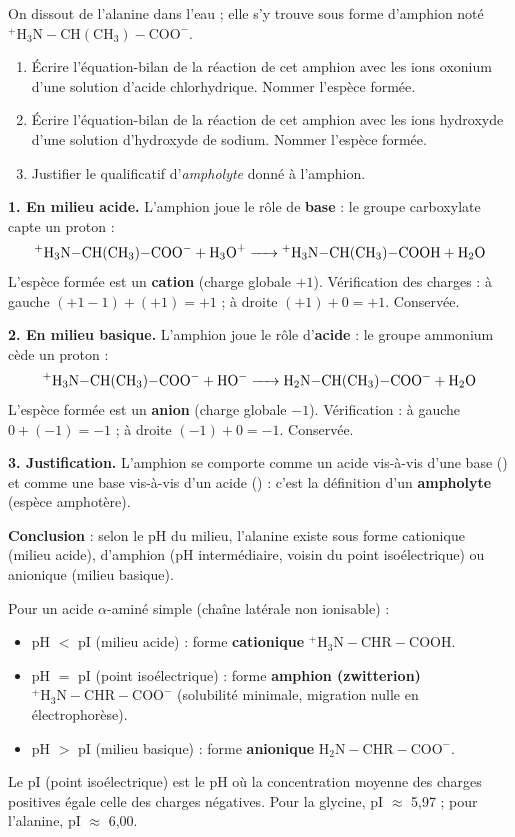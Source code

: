 \documentclass[11pt]{article}
\begin{document}
\begin{exoresolu}
On dissout de l'alanine dans l'eau ; elle s'y trouve sous forme d'amphion noté $\mathrm{^+H_3N{-}CH(CH_3){-}COO^-}$.
\begin{enumerate}
\item Écrire l'équation-bilan de la réaction de cet amphion avec les ions oxonium  d'une solution d'acide chlorhydrique. Nommer l'espèce formée.
\item Écrire l'équation-bilan de la réaction de cet amphion avec les ions hydroxyde  d'une solution d'hydroxyde de sodium. Nommer l'espèce formée.
\item Justifier le qualificatif d'\emph{ampholyte} donné à l'amphion.
\end{enumerate}
\tcblower
\textbf{1. En milieu acide.} L'amphion joue le rôle de \textbf{base} : le groupe carboxylate capte un proton :
\[ \mathrm{^+H_3N{-}CH(CH_3){-}COO^-} + \ce{H3O^+} \ce{->} \mathrm{^+H_3N{-}CH(CH_3){-}COOH} + \ce{H2O} \]
L'espèce formée est un \textbf{cation} (charge globale $+1$). Vérification des charges : à gauche $(+1-1)+(+1)=+1$ ; à droite $(+1)+0=+1$. Conservée.

\textbf{2. En milieu basique.} L'amphion joue le rôle d'\textbf{acide} : le groupe ammonium cède un proton :
\[ \mathrm{^+H_3N{-}CH(CH_3){-}COO^-} + \ce{HO^-} \ce{->} \mathrm{H_2N{-}CH(CH_3){-}COO^-} + \ce{H2O} \]
L'espèce formée est un \textbf{anion} (charge globale $-1$). Vérification : à gauche $0+(-1)=-1$ ; à droite $(-1)+0=-1$. Conservée.

\textbf{3. Justification.} L'amphion se comporte comme un acide vis-à-vis d'une base () et comme une base vis-à-vis d'un acide () : c'est la définition d'un \textbf{ampholyte} (espèce amphotère).

\textbf{Conclusion} : selon le pH du milieu, l'alanine existe sous forme cationique (milieu acide), d'amphion (pH intermédiaire, voisin du point isoélectrique) ou anionique (milieu basique).
\end{exoresolu}

\begin{aretenir}
Pour un acide $\alpha$-aminé simple (chaîne latérale non ionisable) :
\begin{itemize}
\item pH $<$ pI (milieu acide) : forme \textbf{cationique} $\mathrm{^+H_3N{-}CHR{-}COOH}$.
\item pH $=$ pI (point isoélectrique) : forme \textbf{amphion (zwitterion)} $\mathrm{^+H_3N{-}CHR{-}COO^-}$ (solubilité minimale, migration nulle en électrophorèse).
\item pH $>$ pI (milieu basique) : forme \textbf{anionique} $\mathrm{H_2N{-}CHR{-}COO^-}$.
\end{itemize}
Le pI (point isoélectrique) est le pH où la concentration moyenne des charges positives égale celle des charges négatives. Pour la glycine, pI $\approx$ 5,97 ; pour l'alanine, pI $\approx$ 6,00.
\end{aretenir}
\end{document}
